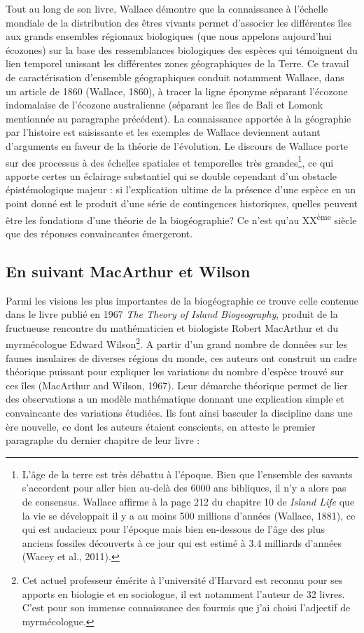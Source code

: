 Tout au long de son livre, Wallace démontre que la connaissance à
l'échelle mondiale de la distribution des êtres vivants permet
d'associer les différentes îles aux grands ensembles régionaux
biologiques (que nous appelons aujourd'hui écozones) sur la base des
ressemblances biologiques des espèces qui témoignent du lien temporel
unissant les différentes zones géographiques de la Terre. Ce travail de
caractérisation d'ensemble géographiques conduit notamment Wallace, dans
un article de 1860 (Wallace, 1860), à tracer la ligne éponyme séparant
l'écozone indomalaise de l'écozone australienne (séparant les îles de
Bali et Lomonk mentionnée au paragraphe précédent). La connaissance
apportée à la géographie par l'histoire est saisissante et les exemples
de Wallace deviennent autant d'arguments en faveur de la théorie de
l'évolution. Le discours de Wallace porte sur des processus à des
échelles spatiales et temporelles très grandes\footnote{L'âge de la
  terre est très débattu à l'époque. Bien que l'ensemble des savants
  s'accordent pour aller bien au-delà des 6000 ans bibliques, il n'y a
  alors pas de consensus. Wallace affirme à la page 212 du chapitre 10
  de \emph{Island Life} que la vie se développait il y a au moins 500
  millions d'années (Wallace, 1881), ce qui est audacieux pour l'époque
  mais bien en-dessous de l'âge des plus anciens fossiles découverts à
  ce jour qui est estimé à 3.4 milliards d'années (Wacey et al., 2011).},
ce qui apporte certes un éclairage substantiel qui se double cependant
d'un obstacle épistémologique majeur : si l'explication ultime de la
présence d'une espèce en un point donné est le produit d'une série de
contingences historiques, quelles peuvent être les fondations d'une
théorie de la biogéographie? Ce n'est qu'au XX\textsuperscript{ème}
siècle que des réponses convaincantes émergeront.

\subsection*{En suivant MacArthur et
Wilson}\label{en-suivant-macarthur-et-wilson}

Parmi les visions les plus importantes de la biogéographie ce trouve
celle contenue dans le livre publié en 1967 \emph{The Theory of Island
Biogeography}, produit de la fructueuse rencontre du mathématicien et
biologiste Robert MacArthur et du myrmécologue Edward Wilson\footnote{Cet
  actuel professeur émérite à l'université d'Harvard est reconnu pour
  ses apports en biologie et en sociologue, il est notamment l'auteur de
  32 livres. C'est pour son immense connaissance des fourmis que j'ai
  choisi l'adjectif de myrmécologue.}. A partir d'un grand nombre de
données sur les faunes insulaires de diverses régions du monde, ces
auteurs ont construit un cadre théorique puissant pour expliquer les
variations du nombre d'espèce trouvé sur ces îles (MacArthur and Wilson,
1967). Leur démarche théorique permet de lier des observations a un
modèle mathématique donnant une explication simple et convaincante des
variations étudiées. Ils font ainsi basculer la discipline dans une ère
nouvelle, ce dont les auteurs étaient conscients, en atteste le premier
paragraphe du dernier chapitre de leur livre :


